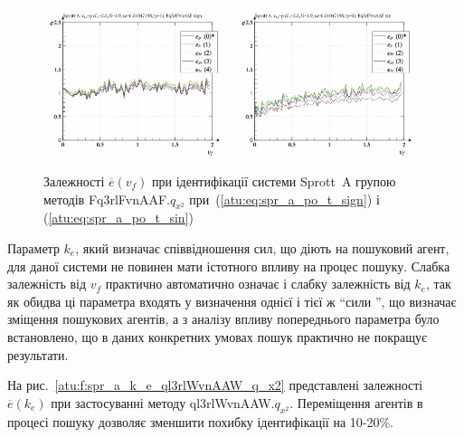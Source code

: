 \begin{figure}[htb!]
  \centerline{
    \includegraphics[width=0.49\textwidth]{p/cha/spr_a/Fq3rlFvnAAF_x2/sprott_a_id-p_v_f_sign.png}
    \hfill
    \includegraphics[width=0.49\textwidth]{p/cha/spr_a/Fq3rlFvnAAF_x2/sprott_a_id-p_v_f_sin.png}
  }
\caption{Залежності $ \overline{e} (v_f) $ при ідентифікації системи Sprott~A групою методів Fq3rlFvnAAF.$q_{x^2} $ при~(\ref{atu:eq:spr_a_po_t_sign}) і (\ref{atu:eq:spr_a_po_t_sin})}
  \label{atu:f:spr_a_v_f_Fq3rlFvnAAF_q_x2}
\end{figure}

Параметр
$ k_e $, який визначає співвідношення сил, що діють на пошуковий
агент, для даної системи не повинен мати істотного впливу на
процес пошуку. Слабка залежність від
$ v_f $ практично автоматично означає і слабку залежність від
$ k_e $, так як обидва ці параметра входять у визначення однієї
і тієї ж ``сили '', що визначає зміщення пошукових агентів, а з
аналізу впливу попереднього параметра було встановлено, що в
даних конкретних умовах пошук практично не покращує результати.


На рис.~\ref{atu:f:spr_a_k_e_ql3rlWvnAAW_q_x2} представлені залежності
$ \overline{e} (k_e) $ при застосуванні методу ql3rlWvnAAW.$q_{x^2} $. Переміщення агентів в процесі пошуку дозволяє зменшити
похибку ідентифікації на 10-20\%.


